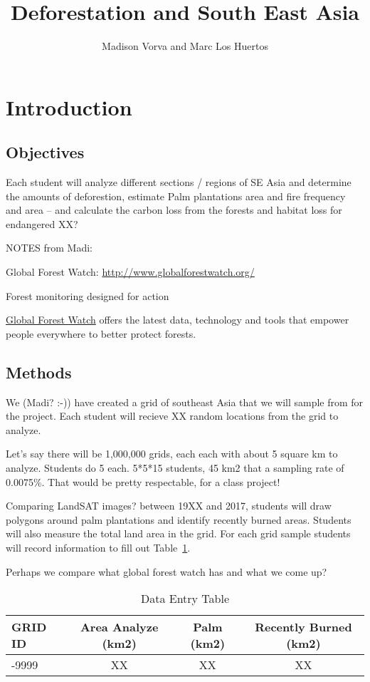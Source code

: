 \documentclass{article}\usepackage[]{graphicx}\usepackage[]{color}
\title{Deforestation and South East Asia}
\author{Madison Vorva and Marc Los Huertos}
\begin{document}
\maketitle

\section{Introduction}

\subsection{Objectives}

Each student will analyze different sections / regions of SE Asia and determine the amounts of deforestion, estimate Palm plantations area and fire frequency and area -- and calculate the carbon loss from the forests and habitat loss for endangered XX?

NOTES from Madi:


Global Forest Watch:
\url{http://www.globalforestwatch.org/}


Forest monitoring designed for action

\href{www.globalforestwatch.org}{Global Forest Watch} offers the latest data, technology and tools that empower people everywhere to better protect forests.


\subsection{Methods}

We (Madi? :-)) have created a grid of southeast Asia that we will sample from for the project. Each student will recieve XX random locations from the grid to analyze. 

Let's say there will be 1,000,000 grids, each each with about 5 square km to analyze. Students do 5 each. 5*5*15 students, 45 km2 that a sampling rate of 0.0075\%. That would be pretty respectable, for a class project!

Comparing LandSAT images? between 19XX and 2017, students will draw polygons around palm plantations and identify recently burned areas. Students will also measure the total land area in the grid. For each grid sample students will record information to fill out Table~\ref{tab:dataentry}.

Perhaps we compare what global forest watch has and what we come up?

\begin{table}[h]
\caption{Data Entry Table}
\label{tab:dataentry}
\begin{tabular}{|l|c|c|c|} \hline
GRID ID  & Area Analyze (km2)  &  Palm (km2) &  Recently Burned (km2) \\ \hline\hline
-9999     & XX    & XX  & XX  \\

\hline
\end{tabular}
\end{table}
\end{document}
